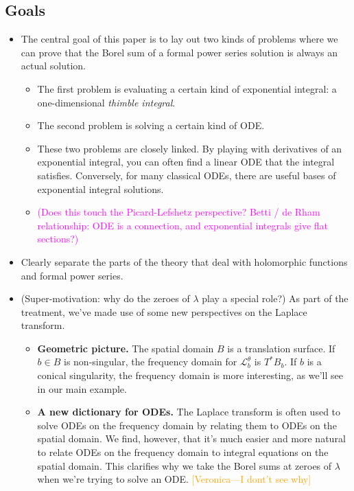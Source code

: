 \documentclass{article}
\newcommand{\laplace}{\mathcal{L}}
\begin{document}
\subsection{Goals}
\begin{itemize}
\item The central goal of this paper is to lay out two kinds of problems where we can prove that the Borel sum of a formal power series solution is always an actual solution.
\begin{itemize}
\item The first problem is evaluating a certain kind of exponential integral: a one-dimensional {\em thimble integral}.
\item The second problem is solving a certain kind of ODE.
\item These two problems are closely linked. By playing with derivatives of an exponential integral, you can often find a linear ODE that the integral satisfies. Conversely, for many classical ODEs, there are useful bases of exponential integral solutions.
\item \textcolor{magenta}{(Does this touch the Picard-Lefshetz perspective? Betti / de Rham relationship: ODE is a connection, and exponential integrals give flat sections?)}
\end{itemize}
\item Clearly separate the parts of the theory that deal with holomorphic functions and formal power series.
\item (Super-motivation: why do the zeroes of $\lambda$ play a special role?) As part of the treatment, we've made use of some new perspectives on the Laplace transform.
\begin{itemize}
\item \textbf{Geometric picture.} The spatial domain $B$ is a translation surface. If $b \in B$ is non-singular, the frequency domain for $\laplace_b^\theta$ is $T^* B_b$. If $b$ is a conical singularity, the frequency domain is more interesting, as we'll see in our main example.
\item \textbf{A new dictionary for ODEs.} The Laplace transform is often used to solve ODEs on the frequency domain by relating them to ODEs on the spatial domain. We find, however, that it's much easier and more natural to relate ODEs on the frequency domain to integral equations on the spatial domain. This clarifies why we take the Borel sums at zeroes of $\lambda$ when we're trying to solve an ODE. \textcolor{orange}{[Veronica---I dont't see why]}
\end{itemize}

\end{itemize}
\end{document}
